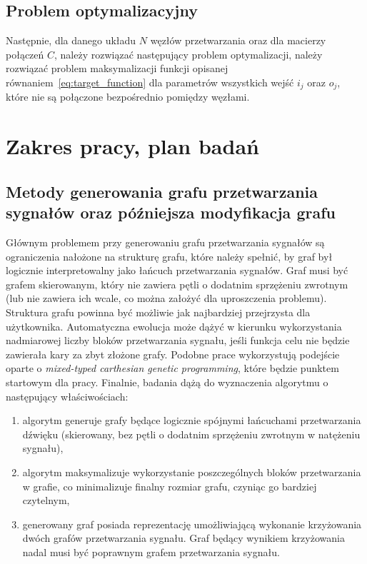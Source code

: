\subsection{Problem optymalizacyjny}

Następnie, dla danego układu $N$ węzłów przetwarzania oraz dla macierzy połączeń $C$, 
należy rozwiązać następujący problem optymalizacji, należy rozwiązać problem
maksymalizacji funkcji opisanej równaniem~\ref{eq:target_function} dla
parametrów wszystkich wejść $i_j$ oraz $o_j$, które nie są połączone bezpośrednio
pomiędzy węzłami.




\section{Zakres pracy, plan badań}

\subsection{Metody generowania grafu przetwarzania sygnałów oraz późniejsza modyfikacja grafu}

Głównym problemem przy generowaniu grafu przetwarzania sygnałów są ograniczenia nałożone na strukturę grafu,
które należy spełnić, by graf był logicznie interpretowalny jako łańcuch przetwarzania sygnałów.
Graf musi być grafem skierowanym, który nie zawiera pętli o dodatnim sprzężeniu zwrotnym 
(lub nie zawiera ich wcale, co można założyć dla uproszczenia problemu).
Struktura grafu powinna być możliwie jak najbardziej przejrzysta dla użytkownika. 
Automatyczna ewolucja może dążyć w kierunku wykorzystania nadmiarowej liczby
bloków przetwarzania sygnału, jeśli funkcja celu nie będzie zawierała kary za zbyt złożone grafy.
Podobne prace \cite{evolutionary_puredata} wykorzystują podejście oparte o 
\textit{mixed-typed carthesian genetic programming}, które będzie punktem startowym dla pracy.
Finalnie, badania dążą do wyznaczenia algorytmu o następujący właściwościach:

\begin{enumerate}
    \item algorytm generuje grafy będące logicznie spójnymi łańcuchami przetwarzania dźwięku (skierowany, bez pętli o dodatnim sprzężeniu zwrotnym w natężeniu sygnału),
    \item algorytm maksymalizuje wykorzystanie poszczególnych bloków przetwarzania w grafie, co minimalizuje finalny rozmiar grafu, czyniąc go bardziej czytelnym,
    \item generowany graf posiada reprezentację umożliwiającą wykonanie krzyżowania dwóch grafów przetwarzania sygnału. Graf będący wynikiem krzyżowania nadal musi być poprawnym grafem przetwarzania sygnału.
\end{enumerate}

